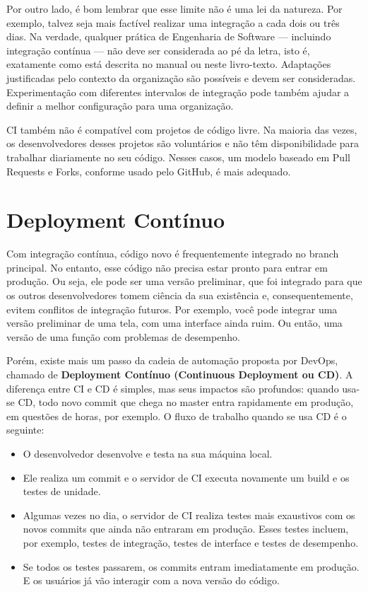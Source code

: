 \documentclass[
  11pt,
  twoside]{book}
\begin{document}
Por outro lado, é bom lembrar que esse limite não é uma lei da natureza.
Por exemplo, talvez seja mais factível realizar uma integração a cada
dois ou três dias. Na verdade, qualquer prática de Engenharia de
Software --- incluindo integração contínua --- não deve ser considerada
ao pé da letra, isto é, exatamente como está descrita no manual ou neste
livro-texto. Adaptações justificadas pelo contexto da organização são
possíveis e devem ser consideradas. Experimentação com diferentes
intervalos de integração pode também ajudar a definir a melhor
configuração para uma organização.

CI também não é compatível com projetos de código livre. Na maioria das
vezes, os desenvolvedores desses projetos são voluntários e não têm
disponibilidade para trabalhar diariamente no seu código. Nesses casos,
um modelo baseado em Pull Requests e Forks, conforme usado pelo GitHub,
é mais adequado.

\hypertarget{deployment-contuxednuo}{%
\section{Deployment Contínuo}\label{deployment-contuxednuo}}


Com integração contínua, código novo é frequentemente integrado no
branch principal. No entanto, esse código não precisa estar pronto para
entrar em produção. Ou seja, ele pode ser uma versão preliminar, que foi
integrado para que os outros desenvolvedores tomem ciência da sua
existência e, consequentemente, evitem conflitos de integração futuros.
Por exemplo, você pode integrar uma versão preliminar de uma tela, com
uma interface ainda ruim. Ou então, uma versão de uma função com
problemas de desempenho.

Porém, existe mais um passo da cadeia de automação proposta por DevOps,
chamado de \textbf{Deployment Contínuo (Continuous Deployment ou CD)}. A
diferença entre CI e CD é simples, mas seus impactos são profundos:
quando usa-se CD, todo novo commit que chega no master entra rapidamente
em produção, em questões de horas, por exemplo. O fluxo de trabalho
quando se usa CD é o seguinte:

\begin{itemize}
\item
  O desenvolvedor desenvolve e testa na sua máquina local.
\item
  Ele realiza um commit e o servidor de CI executa novamente um build e
  os testes de unidade.
\item
  Algumas vezes no dia, o servidor de CI realiza testes mais exaustivos
  com os novos commits que ainda não entraram em produção. Esses testes
  incluem, por exemplo, testes de integração, testes de interface e
  testes de desempenho.
\item
  Se todos os testes passarem, os commits entram imediatamente em
  produção. E os usuários já vão interagir com a nova versão do código.
\end{itemize}
\end{document}
